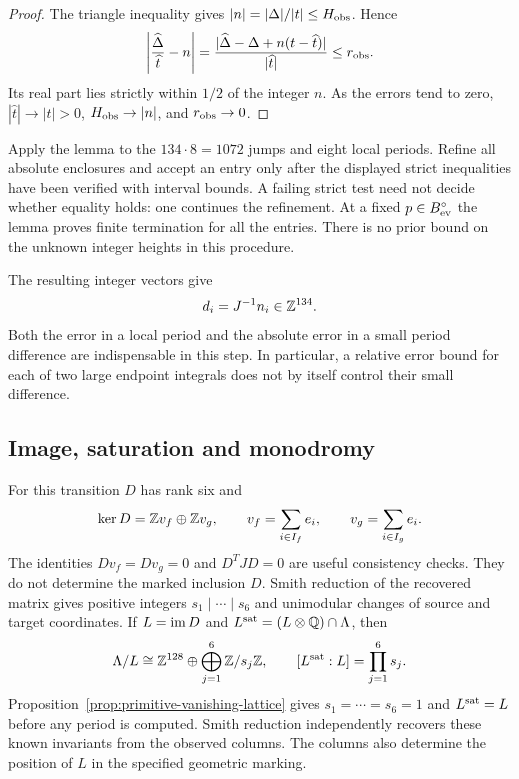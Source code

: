 \begin{proof}
The triangle inequality gives
$|n|=|\Delta|/|t|\le H_{\rm obs}$. Hence
\[
 \left|\frac{\widehat\Delta}{\widehat t}-n\right|
 =\frac{|\widehat\Delta-\Delta+n(t-\widehat t)|}
           {|\widehat t|}
 \le r_{\rm obs}.
\]
Its real part lies strictly within $1/2$ of the integer $n$.
As the errors tend to zero, $|\widehat t|\to|t|>0$,
$H_{\rm obs}\to|n|$, and $r_{\rm obs}\to0$.
\end{proof}

Apply the lemma to the $134\cdot8=1072$ jumps and eight local
periods. Refine all absolute enclosures and accept an entry only after
the displayed strict inequalities have been verified with interval
bounds. A failing strict test need not decide whether equality holds:
one continues the refinement. At a fixed $p\in B_{\rm ev}^\circ$
the lemma proves finite termination for all the entries. There is
no prior bound on the unknown integer heights in this procedure.

The resulting integer vectors give
\begin{equation}\label{eq:recover-D}
                    d_i=J^{-1}n_i\in\mathbb Z^{134}.
\end{equation}
Both the error in a local period and the absolute error in a small
period difference are indispensable in this step. In particular, a
relative error bound for each of two large endpoint integrals does
not by itself control their small difference.

\subsection{Image, saturation and monodromy}

For this transition $D$ has rank six and
\[
 \ker D=\mathbb Z v_f\oplus\mathbb Z v_g,
 \qquad v_f=\sum_{i\in I_f}e_i,
 \qquad v_g=\sum_{i\in I_g}e_i.
\]
The identities $Dv_f=Dv_g=0$ and $D^TJD=0$ are useful consistency
checks. They do not determine the marked inclusion $D$.
Smith reduction of the recovered matrix gives positive integers
$s_1\mid\cdots\mid s_6$ and unimodular changes of source and
target coordinates. If $L=\operatorname{im} D$ and
$L^{\rm sat}=(L\otimes\mathbb Q)\cap\Lambda$, then
\begin{equation}\label{eq:smith-outputs}
 \Lambda/L\cong\mathbb Z^{128}\oplus\bigoplus_{j=1}^6\mathbb Z/s_j\mathbb Z,
 \qquad [L^{\rm sat}:L]=\prod_{j=1}^6s_j.
\end{equation}
Proposition~\ref{prop:primitive-vanishing-lattice} gives
$s_1=\cdots=s_6=1$ and $L^{\rm sat}=L$ before any period is
computed. Smith reduction independently recovers these known
invariants from the observed columns. The columns also determine
the position of $L$ in the specified geometric marking.

